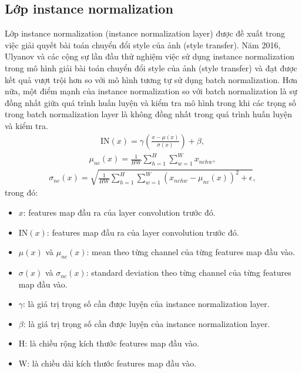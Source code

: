 {    \subsection{Lớp instance normalization}
    Lớp instance normalization (instance normalization layer) được đề xuất trong việc giải quyết bài toán chuyển đổi style của ảnh (style transfer). Năm 2016, Ulyanov và các cộng sự lần đầu thử nghiệm việc sử dụng instance normalization trong mô hình giải bài toán chuyển đổi style của ảnh (style transfer) và đạt được kết quả vượt trội hơn so với mô hình tương tự sử dụng batch normalization. Hơn nữa, một điểm mạnh của instance normalization so với batch normalization là sự đồng nhất giữa quá trình huấn luyện và kiểm tra mô hình trong khi các trọng số trong batch normalization layer là không đồng nhất trong quá trình huấn luyện và kiểm tra.
    \begin{align}
    \textrm{IN}(x)= \gamma\left(\frac{x-\mu(x)}{\sigma(x)}\right)+\beta  ,
    \end{align}
    \begin{align}
    \mu_{nc}(x) = \frac{1}{HW}\sum_{h=1}^{H}\sum_{w=1}^{W}x_{nchw}  ,
    \end{align}
    \begin{align}
    \sigma_{nc}(x) = \sqrt{\frac{1}{HW}\sum_{h=1}^{H}\sum_{w=1}^{W}(x_{nchw} - \mu_{nc}(x))^{2} + \epsilon}  ,
    \end{align}
	\noindent trong đó:
	\begin{itemize}[leftmargin=0cm,itemindent=.5cm,labelwidth=\itemindent,labelsep=0cm,align=left]
        \item $x$: features map đầu ra của layer convolution trước đó.
        \item $\textrm{IN}(x)$: features map đầu ra của layer convolution trước đó.
        \item $\mu(x)$ và $\mu_{nc}(x)$: mean theo từng channel của từng features map đầu vào.
        \item $\sigma(x)$ và $\sigma_{nc}(x)$: standard deviation theo từng channel của từng features map đầu vào.
        \item $\gamma$: là giá trị trọng số cần được luyện của instance normalization layer.
        \item $\beta$: là giá trị trọng số cần được luyện của instance normalization layer.
        \item H: là chiều rộng kích thước features map đầu vào.
        \item W: là chiều dài kích thước features map đầu vào.
    \end{itemize}

}
